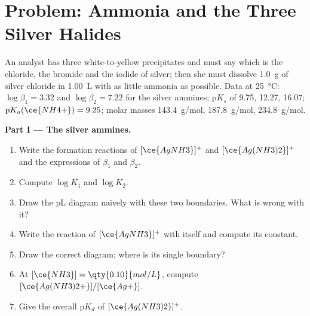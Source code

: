 \section{Problem: Ammonia and the Three Silver Halides}

\begin{problem}
\label{pb:b1:complexation:1}
An analyst has three white-to-yellow precipitates and must say which is
the chloride, the bromide and the iodide of silver; then she must
dissolve \qty{1.0}{g} of silver chloride in \qty{1.00}{L} with as little
ammonia as possible. Data at \qty{25}{\celsius}: $\log\beta_1 = 3.32$ and
$\log\beta_2 = 7.22$ for the silver ammines; $\mathrm{p}K_s$ of 
9.75,  12.27,  16.07; $\mathrm{p}K_a(\ce{NH4+}) = 9.25$;
molar masses  \qty{143.4}{g/mol},  \qty{187.8}{g/mol},
 \qty{234.8}{g/mol}.

\medskip
\noindent\textbf{Part I --- The silver ammines.}
\begin{enumerate}
  \item Write the formation reactions of $[\ce{AgNH3}]^{+}$ and
        $[\ce{Ag(NH3)2}]^{+}$ and the expressions of $\beta_1$ and $\beta_2$.
  \item Compute $\log K_1$ and $\log K_2$.
  \item Draw the pL diagram naively with these two boundaries. What is
        wrong with it?
  \item Write the reaction of $[\ce{AgNH3}]^{+}$ with itself and compute
        its constant.
  \item Draw the correct diagram; where is its single boundary?
  \item At $[\ce{NH3}] = \qty{0.10}{mol/L}$, compute
        $[\ce{Ag(NH3)2+}]/[\ce{Ag+}]$.
  \item Give the overall  $\mathrm{p}K_d$ of
        $[\ce{Ag(NH3)2}]^{+}$.
\end{enumerate}


\end{problem}
